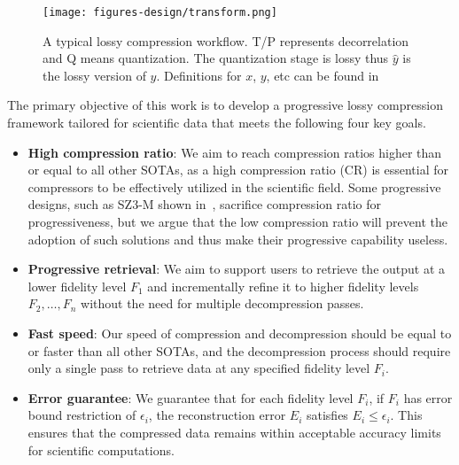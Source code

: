 \begin{figure}[ht]
\vspace{-4mm}
    \centering
    \texttt{[image: figures-design/transform.png]}
    \setlength{\abovecaptionskip}{1mm}
    \caption{A typical lossy compression workflow. T/P represents decorrelation and Q means quantization. The quantization stage is lossy thus $\hat y$ is the lossy version of $y$. Definitions for $x$, $y$, etc can be found in~}
    \label{fig:transform} %
\end{figure}


The primary objective of this work is to develop a progressive lossy compression framework tailored for scientific data that meets the following four key goals.

\begin{itemize}
        \item \textbf{High compression ratio}: We aim to reach compression ratios higher than or equal to all other SOTAs, as a high compression ratio (CR) is essential for compressors to be effectively utilized in the scientific field. Some progressive designs, such as SZ3-M shown in~, sacrifice compression ratio for progressiveness, but we argue that the low compression ratio will prevent the adoption of such solutions and thus make their progressive capability useless.
    \item \textbf{Progressive retrieval}: We aim to support users to retrieve the output at a lower fidelity level \( F_1 \) and incrementally refine it to higher fidelity levels \( F_2, \dots, F_n \) without the need for multiple decompression passes.
    \item \textbf{Fast speed}: Our speed of compression and decompression should be equal to or faster than all other SOTAs, and the decompression process should require only a single pass to retrieve data at any specified fidelity level \( F_i \).
    \item \textbf{Error guarantee}: We guarantee that for each fidelity level \( F_i \), if \( F_i \) has error bound restriction of \( \epsilon_i \), the reconstruction error \( E_i \) satisfies \( E_i \leq \epsilon_i \). This ensures that the compressed data remains within acceptable accuracy limits for scientific computations.
\end{itemize}



